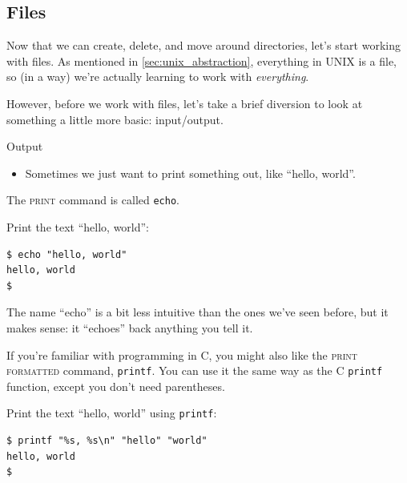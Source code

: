 \subsection{Files}

Now that we can create, delete, and move around directories, let's start
working with files.  As mentioned in \autoref{sec:unix_abstraction}, everything in
UNIX is a file, so (in a way) we're actually learning to work with
\textit{everything}.

However, before we work with files, let's take a brief diversion to look at
something a little more basic: input/output.

\begin{frame}[fragile]{Output}
  \begin{itemize}
    \item
      Sometimes we just want to print something out, like \enquote{hello,
      world}.
  \end{itemize}
  \pause
  \alert<2>{The \textsc{print} command is called \texttt{echo}}.
  \pause
  \begin{example}[echo]
    Print the text \enquote{hello, world}:
    \begin{verbatim}
$ echo "hello, world"
hello, world
$ 
    \end{verbatim}
  \end{example}
\end{frame}

The name \enquote{echo} is a bit less intuitive than the ones we've seen
before, but it makes sense: it \enquote{echoes} back anything you tell it.

If you're familiar with programming in C, you might also like the \textsc{print
formatted} command, \texttt{printf}.  You can use it the same way as the C
\texttt{printf} function, except you don't need parentheses.

\begin{example}[printf]
  Print the text \enquote{hello, world} using \texttt{printf}:
  \begin{verbatim}
$ printf "%s, %s\n" "hello" "world"
hello, world
$ 
  \end{verbatim}
\end{example}

